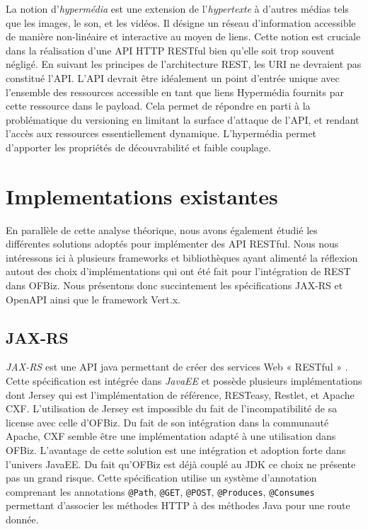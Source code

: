 \documentclass[a4paper, 11pt]{report}
\begin{document}
La notion d'\emph{hypermédia} est une extension de l'\emph{hypertexte}
à d'autres médias tels que les images, le son, et les vidéos.  Il
désigne un réseau d'information accessible de manière non-linéaire et
interactive au moyen de liens.  Cette notion est cruciale dans la
réalisation d'une API HTTP RESTful bien qu'elle soit trop souvent
négligé.  En suivant les principes de l'architecture REST, les URI ne
devraient pas constitué l'API.  L'API devrait être idéalement un point
d'entrée unique avec l'ensemble des ressources accessible en tant que
liens Hypermédia fournits par cette ressource dans le payload. Cela
permet de répondre en parti à la problématique du versioning en
limitant la surface d'attaque de l'API, et rendant l'accès aux
ressources essentiellement dynamique.  L'hypermédia permet d'apporter
les propriétés de découvrabilité et faible couplage.

\section{Implementations existantes}

En parallèle de cette analyse théorique, nous avons également étudié
les différentes solutions adoptés pour implémenter des API RESTful.
Nous nous intéressons ici à plusieurs frameworks et bibliothèques
ayant alimenté la réflexion autout des choix d'implémentations qui ont
été fait pour l'intégration de REST dans OFBiz.  Nous présentons donc
succintement les spécifications JAX-RS et OpenAPI ainsi que le
framework Vert.x.

\subsection{JAX-RS}

\emph{JAX-RS} est une API java permettant de créer des services Web «
RESTful » \cite{pericas2013jax}. Cette spécification est intégrée dans
\emph{JavaEE} et possède plusieurs implémentations dont Jersey qui est
l'implémentation de référence, RESTeasy, Restlet, et Apache CXF.
L'utilisation de Jersey est impossible du fait de l'incompatibilité de
sa license avec celle d'OFBiz.  Du fait de son intégration dans la
communauté Apache, CXF semble être une implémentation adapté à une
utilisation dans OFBiz.  L'avantage de cette solution est une
intégration et adoption forte dans l'univers JavaEE.  Du fait qu'OFBiz
est déjà couplé au JDK ce choix ne présente pas un grand risque. Cette
spécification utilise un système d'annotation comprenant les
annotations \verb=@Path=, \verb=@GET=, \verb=@POST=, \verb=@Produces=,
\verb=@Consumes= permettant d'associer les méthodes HTTP à des
méthodes Java pour une route donnée.
\end{document}
